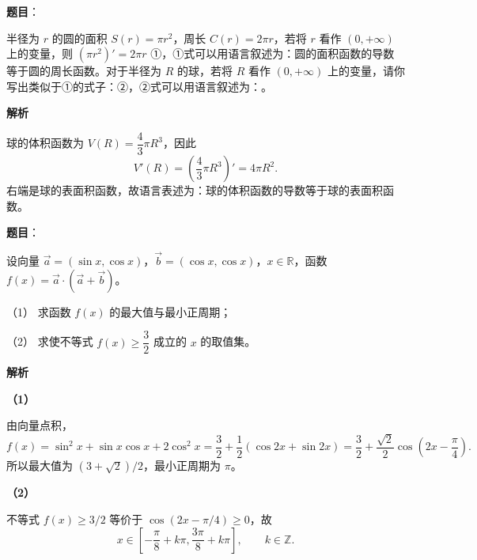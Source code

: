 \begin{answer}

\textbf{题目}：

半径为 $r$ 的圆的面积 $S(r)=\pi r^2$，周长 $C(r)=2\pi r$，若将 $r$ 看作 $(0,+\infty)$ 上的变量，则 $(\pi r^2)'=2\pi r$ ①，①式可以用语言叙述为：圆的面积函数的导数等于圆的周长函数。对于半径为 $R$ 的球，若将 $R$ 看作 $(0,+\infty)$ 上的变量，请你写出类似于①的式子：\gkblank{}②，②式可以用语言叙述为：\gkblank{}。

\textbf{解析}

球的体积函数为 $V(R)=\dfrac43\pi R^3$，因此
\nopagebreak[4]
\[
V'(R)=\left(\frac43\pi R^3\right)'=4\pi R^2.
\]
右端是球的表面积函数，故语言表述为：球的体积函数的导数等于球的表面积函数。


\end{answer}
\begin{answer}

\textbf{题目}：

设向量 $\vec a=(\sin x,\cos x)$，$\vec b=(\cos x,\cos x)$，$x\in\mathbb R$，函数 $f(x)=\vec a\cdot(\vec a+\vec b)$。

（1） 求函数 $f(x)$ 的最大值与最小正周期；

（2） 求使不等式 $f(x)\geqslant\dfrac32$ 成立的 $x$ 的取值集。

\textbf{解析}

\textbf{（1）}

由向量点积，
\nopagebreak[4]
\[
f(x)=\sin^2x+\sin x\cos x+2\cos^2x
=\frac32+\frac12(\cos2x+\sin2x)
=\frac32+\frac{\sqrt2}{2}\cos\left(2x-\frac\pi4\right).
\]
所以最大值为 $(3+\sqrt2)/2$，最小正周期为 $\pi$。

\textbf{（2）}

不等式 $f(x)\geqslant3/2$ 等价于 $\cos(2x-\pi/4)\geqslant0$，故
\nopagebreak[4]
\[
x\in\left[-\frac\pi8+k\pi,\frac{3\pi}8+k\pi\right],\qquad k\in\mathbb Z.
\]



\end{answer}
